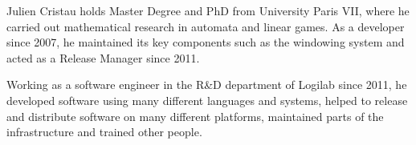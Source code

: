 \begin{participant}[type=PI,PM=18,gender=male]{Julien Cristau}
  holds Master Degree and PhD from University Paris VII, where he carried out
  mathematical research in automata and linear games. As a 
  developer since 2007, he maintained its key components such as the
   windowing system and acted as a  Release
  Manager since 2011.

  Working as a software engineer in the R\&D department of Logilab since
  2011, he developed software using many different languages and systems,
  helped to release and distribute software on many different platforms,
  maintained parts of the infrastructure and trained other people.
\end{participant}
